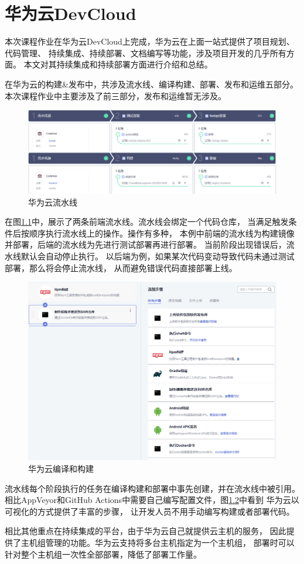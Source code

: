 \chapter{华为云DevCloud}

本次课程作业在华为云DevCloud上完成，华为云在上面一站式提供了项目规划、代码管理、
持续集成、持续部署、文档编写等功能，涉及项目开发的几乎所有方面。
本文对其持续集成和持续部署方面进行介绍和总结。

在华为云的构建\&发布中，共涉及流水线、编译构建、部署、发布和运维五部分。
本次课程作业中主要涉及了前三部分，发布和运维暂无涉及。

\begin{figure}[h]
    \centering
    \includegraphics[width=1\textwidth]{figures/huawei/pipeline.png}
    \caption{华为云流水线}
    \label{fig:huawei_pipeline}
\end{figure}

在图\ref{fig:huawei_pipeline}中，展示了两条前端流水线。流水线会绑定一个代码仓库，
当满足触发条件后按顺序执行流水线上的操作。操作有多种，
本例中前端的流水线为构建镜像并部署，后端的流水线为先进行测试部署再进行部署。
当前阶段出现错误后，流水线默认会自动停止执行。
以后端为例，如果某次代码变动导致代码未通过测试部署，那么将会停止流水线，
从而避免错误代码直接部署上线。

\begin{figure}[h]
    \centering
    \includegraphics[width=1\textwidth]{figures/huawei/build.png}
    \caption{华为云编译和构建}
    \label{fig:huawei_build}
\end{figure}

流水线每个阶段执行的任务在编译构建和部署中事先创建，并在流水线中被引用。
相比AppVeyor和GitHub Actions中需要自己编写配置文件，图\ref{fig:huawei_build}中看到
华为云以可视化的方式提供了丰富的步骤， 让开发人员不用手动编写构建或者部署代码。

相比其他重点在持续集成的平台，由于华为云自己就提供云主机的服务，
因此提供了主机组管理的功能。华为云支持将多台主机指定为一个主机组，
部署时可以针对整个主机组一次性全部部署，降低了部署工作量。